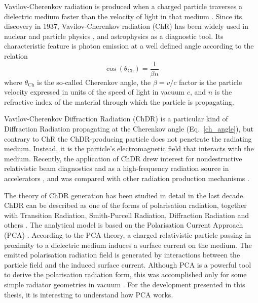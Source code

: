 Vavilov-Cherenkov radiation is produced when a charged particle traverses a dielectric medium faster than the velocity of light in that medium \cite{PhysRev.52.378, tamm_th}. Since its discovery in 1937, Vavilov-Cherenkov radiation (ChR) has been widely used in nuclear and particle physics \cite{Leo:302344}, and astrophysics \cite{RevModPhys.88.030501, RevModPhys.83.907} as a diagnostic tool. Its characteristic feature is photon emission at a well defined angle according to the relation
\begin{equation}
\cos (\theta_\text{Ch}) = \frac{1}{\beta n}\label{ch_angle}
\end{equation}
where $\theta_\text{Ch}$ is the so-called Cherenkov angle, the $\beta = v/c$ factor is the particle velocity expressed in units of the speed of light in vacuum $c$, and $n$ is the refractive index of the material through which the particle is propagating.

Vavilov-Cherenkov Diffraction Radiation (ChDR) is a particular kind of Diffraction Radiation propagating at the Cherenkov angle (Eq.~\ref{ch_angle}), but contrary to ChR the ChDR-producing particle does not penetrate the radiating medium. Instead, it is the particle's electromagnetic field that interacts with the medium. Recently, the application of ChDR drew interest for nondestructive relativistic beam diagnostics \cite{ch_dr_ibic19, Bergamaschi:2019kck} and as a high-frequency radiation source in accelerators  \cite{PhysRevLett.103.095003}, and was compared with other radiation production mechanisms \cite{PhysRevAccelBeams.22.020402}.

The theory of ChDR generation has been studied in detail in the last decade. ChDR can be described as one of the forms of polarisation radiation, together with Transition Radiation, Smith-Purcell Radiation, Diffraction Radiation and others \cite{Karlovets:2009su}. The analytical model is based on the Polarisation Current Approach (PCA) \cite{russ_ph}. According to the PCA theory, a charged relativistic particle passing in proximity to a dielectric medium induces a surface current on the medium. The emitted polarisation radiation field is generated by interactions between the particle field and the induced surface current. Although PCA is a powerful tool to derive the polarisation radiation form, this was accomplished only for some simple radiator geometries in vacuum \cite{Shevelev:2014doa, PhysRevLett.113.064802}. For the development presented in this thesis, it is interesting to understand how PCA works. 

